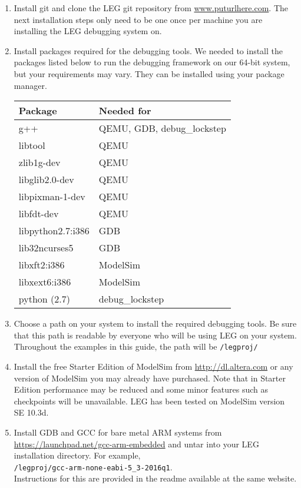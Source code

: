 \begin{enumerate}
\item Install git and clone the LEG git repository from \url{www.puturlhere.com}. 
The next installation steps only need to be one once per machine you are installing the LEG debugging system on.

\item Install packages required for the debugging tools. We needed to install the packages listed below to run the debugging framework on our 64-bit system, but your requirements may vary.
They can be installed using your package manager.

\begin{tabular}{|l|l|}
\hline 
\textbf{Package} & \textbf{Needed for} \\\hline
g++ & QEMU, GDB, debug\_lockstep \\\hline
libtool & QEMU \\\hline
zlib1g-dev & QEMU \\\hline
libglib2.0-dev & QEMU \\\hline
libpixman-1-dev & QEMU \\\hline
libfdt-dev & QEMU \\\hline
libpython2.7:i386 & GDB \\\hline
lib32ncurses5 & GDB \\\hline
libxft2:i386 & ModelSim \\\hline
libxext6:i386 & ModelSim \\\hline
python (2.7)& debug\_lockstep \\\hline
\end{tabular}

\item Choose a path on your system to install the required debugging tools. 
Be sure that this path is readable by everyone who will be using LEG on your system.
Throughout the examples in this guide, the path will be \texttt{/legproj/}

\item Install the free Starter Edition of ModelSim from \url{http://dl.altera.com} or any version of ModelSim you may already have purchased. 
Note that in Starter Edition performance may be reduced and some minor features such as checkpoints will be unavailable. 
LEG has been tested on ModelSim version SE 10.3d. 

\item Install GDB and GCC for bare metal ARM systems from \url{https://launchpad.net/gcc-arm-embedded} and untar into your LEG installation directory. 
For example, \\\texttt{/legproj/gcc-arm-none-eabi-5\_3-2016q1}.\\
Instructions for this are provided in the readme available at the same website.


\end{enumerate}
